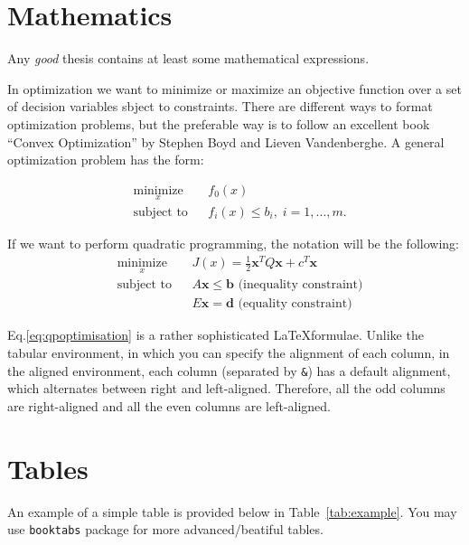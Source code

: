 \documentclass[a4paper,11pt,phdthesis,twoside,oneandhalfspace]{cssethesis}  %
\begin{document}
\section{Mathematics}
Any \textit{good} thesis contains at least some mathematical expressions. 

In optimization we want to minimize or maximize an objective function over a set of decision variables sbject to constraints. There are different ways to format optimization problems, but the preferable way is to follow an excellent book ``Convex Optimization'' by Stephen Boyd and Lieven Vandenberghe. A general optimization problem has the form:

\begin{equation*}
 \begin{aligned}
 & \underset{x}{\text{minimize}}
 & & f_0(x) \\
 & \text{subject to}
 & & f_i(x) \leq b_i, \; i = 1, \ldots, m.
 \end{aligned}
\end{equation*}

If we want to perform quadratic programming, the notation will be the following:
\begin{equation}\label{eq:qpoptimisation}
 \begin{aligned}
 & \underset{x}{\text{minimize}}
 & & J(x) = \frac{1}{2} \mathbf{x}^T Q \mathbf{x} + c^T \mathbf{x} \\
 & \text{subject to} 
 & & A\mathbf{x} \leq \mathbf b \mbox{  (inequality constraint)} \\
 & 
 & &     E\mathbf{x} = \mathbf d  \mbox{  (equality constraint)}
 \end{aligned}
\end{equation}

Eq.\ref{eq:qpoptimisation} is a rather sophisticated \LaTeX formulae. Unlike the tabular environment, in which you can specify the alignment of each column, in the aligned environment, each column (separated by \verb|&|) has a default alignment, which alternates between right and left-aligned. Therefore, all the odd columns are right-aligned and all the even columns are left-aligned.




\section{Tables}
An example of a simple table is provided below in Table~\ref{tab:example}. You may use \verb+booktabs+ package for more advanced/beatiful tables.
\end{document}

